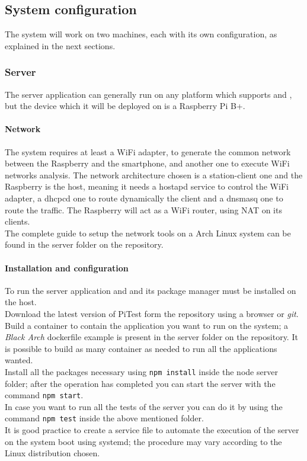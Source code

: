 \documentclass[../PiTest.tex]{subfiles}
\begin{document}
\subsection{System configuration}
The system will work on two machines, each with its own configuration, as explained in the next sections.

\subsubsection{Server}
The server application can generally run on any platform which supports  and \docker, but the device which it will be deployed on is a Raspberry Pi B+.

\paragraph{Network}
The system requires at least a WiFi adapter, to generate the common network between the Raspberry and the smartphone, and another one to execute WiFi networks analysis.
The network architecture chosen is a station-client one and the Raspberry is the host, meaning it needs a hostapd service to control the WiFi adapter, a dhcpcd one to route dynamically the client and a dnsmasq one to route the traffic. The Raspberry will act as a WiFi router, using NAT on its clients.\\
The complete guide to setup the network tools on a Arch Linux system can be found in the server folder on the repository.

\paragraph{Installation and configuration}
To run the server application \docker and \nodejs and its package manager \npm must be installed on the host.\\
Download the latest version of PiTest form the repository using a browser or \textit{git}.\\
Build a \docker container to contain the application you want to run on the system; a \textit{Black Arch} dockerfile example is present in the server folder on the repository. It is possible to build as many container as needed to run all the applications wanted.\\
Install all the packages necessary using \texttt{npm install} inside the node server folder; after the operation has completed you can start the server with the command \texttt{npm start}.\\
In case you want to run all the tests of the server you can do it by using the command \texttt{npm test} inside the above mentioned folder.\\
It is good practice to create a service file to automate the execution of the server on the system boot using systemd; the procedure may vary according to the Linux distribution chosen.
\end{document}
